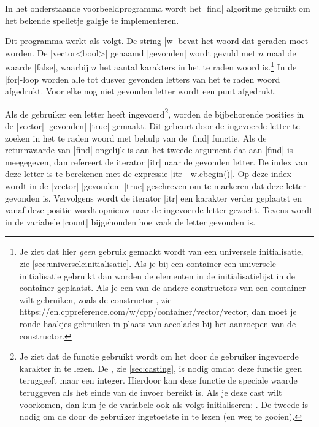 \begin{cpplstShortInline}
\label{sec:find}
In het onderstaande voorbeeldprogramma  wordt het |find| algoritme gebruikt om het bekende spelletje galgje te implementeren.

Dit programma werkt als volgt.
De string |w| bevat het woord dat geraden moet worden.
De |vector<bool>| genaamd |gevonden| wordt gevuld met $n$ maal de waarde |false|, waarbij $n$ het aantal karakters in het te raden woord is.\footnote{%
	Je ziet dat hier \emph{geen} gebruik gemaakt wordt van een universele initialisatie, zie \cref{sec:universeleinitialisatie}.
	Als je bij een container een universele initialisatie gebruikt dan worden de elementen in de initialisatielijst in de container geplaatst.
	Als je een van de andere constructors van een container wilt gebruiken, zoals de constructor , zie \url{https://en.cppreference.com/w/cpp/container/vector/vector}, dan moet je ronde haakjes gebruiken in plaats van accolades bij het aanroepen van de constructor. 
}
In de |for|\hyp{}loop worden alle tot dusver gevonden letters van het te raden woord afgedrukt.
Voor elke nog niet gevonden letter wordt een punt afgedrukt.

Als de gebruiker een letter heeft ingevoerd\footnote{%
	Je ziet dat de functie  gebruikt wordt om het door de gebruiker ingevoerde karakter in te lezen.
	De , zie \cref{sec:casting}, is nodig omdat deze functie geen  teruggeeft maar een integer.
	Hierdoor kan deze functie de speciale waarde  teruggeven als het einde van de invoer bereikt is.
	Als je deze cast wilt voorkomen, dan kun je de variabele  ook als volgt initialiseren: .
	De tweede  is nodig om de door de gebruiker ingetoetste  in te lezen (en weg te gooien).
}, worden de bijbehorende posities in de |vector| |gevonden| |true| gemaakt.
Dit gebeurt door de ingevoerde letter te zoeken in het te raden woord met behulp van de |find| functie.
Als de returnwaarde van |find| ongelijk is aan het tweede argument dat aan |find| is meegegeven, dan refereert de iterator |itr| naar de gevonden letter.
De index van deze letter is te berekenen met de expressie |itr - w.cbegin()|.
Op deze index wordt in de |vector| |gevonden| |true| geschreven om te markeren dat deze letter gevonden is.
Vervolgens wordt de iterator |itr| een karakter verder geplaatst en vanaf deze positie wordt opnieuw naar de ingevoerde letter gezocht.
Tevens wordt in de variabele |count| bijgehouden hoe vaak de letter gevonden is.


\end{cpplstShortInline}
